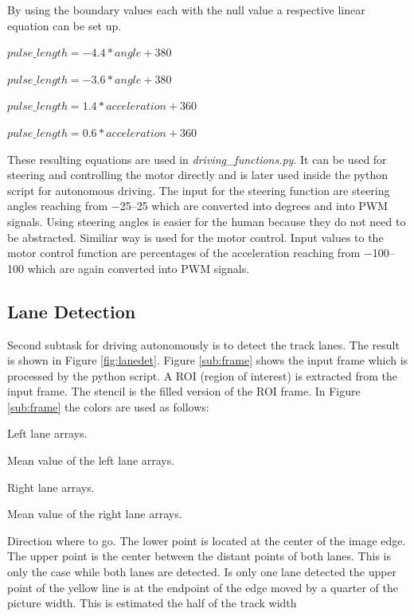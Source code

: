 \documentclass[conference]{IEEEtran}
\begin{document}
By using the boundary values each with the null value a respective linear equation can be set up.
\begin{description}
\setlength\itemsep{.25em}
\item[Left] $ pulse\_length = -4.4 * angle + 380 $
\item[Right] $ pulse\_length = -3.6 * angle + 380 $
\item[Forwards] $ pulse\_length = 1.4 * acceleration + 360 $
\item[Backwards] $ pulse\_length = 0.6 * acceleration + 360 $
\end{description}
These resulting equations are used in \textit{driving\_functions.py}.
It can be used for steering and controlling the motor directly and is later used inside the python script for autonomous driving.
The input for the steering function are steering angles reaching from \numrange{-25}{25} which are converted into degrees and into PWM signals.
Using steering angles is easier for the human because they do not need to be abstracted.
Similiar way is used for the motor control.
Input values to the motor control function are percentages of the acceleration reaching from \numrange{-100}{100} which are again converted into PWM signals.

\subsection{Lane Detection} \label{ssec:lanedet}

Second subtask for driving autonomously is to detect the track lanes.
The result is shown in Figure \ref{fig:lanedet}.
Figure \ref{sub:frame} shows the input frame which is processed by the python script.
A ROI (region of interest) is extracted from the input frame.
The stencil is the filled version of the ROI frame.
In Figure \ref{sub:frame} the colors are used as follows:
\begin{description}
	\setlength\itemsep{.25em}
	\item[Green] Left lane arrays.
	\item[Red] Mean value of the left lane arrays.
	\item[Blue] Right lane arrays.
	\item[Pink] Mean value of the right lane arrays.
	\item[Yellow] Direction where to go. The lower point is located at the center of the image edge. The upper point is the center between the distant points of both lanes. This is only the case while both lanes are detected. Is only one lane detected the upper point of the yellow line is at the endpoint of the edge moved by a quarter of the picture width. This is estimated the half of the track width
\end{description}
\end{document}
